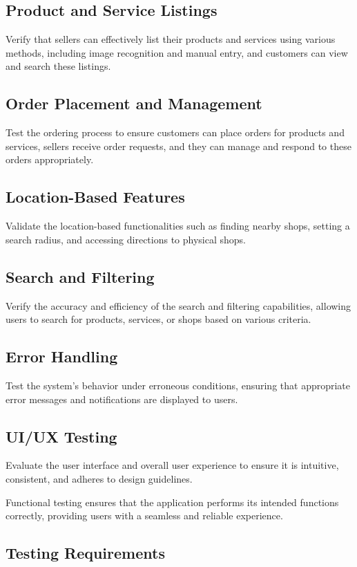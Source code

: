 \subsection{Product and Service Listings} Verify that sellers can effectively list their products and services using various methods, including image recognition and manual entry, and customers can view and search these listings.

\subsection{Order Placement and Management} Test the ordering process to ensure customers can place orders for products and services, sellers receive order requests, and they can manage and respond to these orders appropriately.

\subsection{Location-Based Features} Validate the location-based functionalities such as finding nearby shops, setting a search radius, and accessing directions to physical shops.

\subsection{Search and Filtering} Verify the accuracy and efficiency of the search and filtering capabilities, allowing users to search for products, services, or shops based on various criteria.

\subsection{Error Handling} Test the system's behavior under erroneous conditions, ensuring that appropriate error messages and notifications are displayed to users.

\subsection{UI/UX Testing} Evaluate the user interface and overall user experience to ensure it is intuitive, consistent, and adheres to design guidelines.
	

Functional testing ensures that the application performs its intended functions correctly, providing users with a seamless and reliable experience.


\subsection{Testing Requirements}

